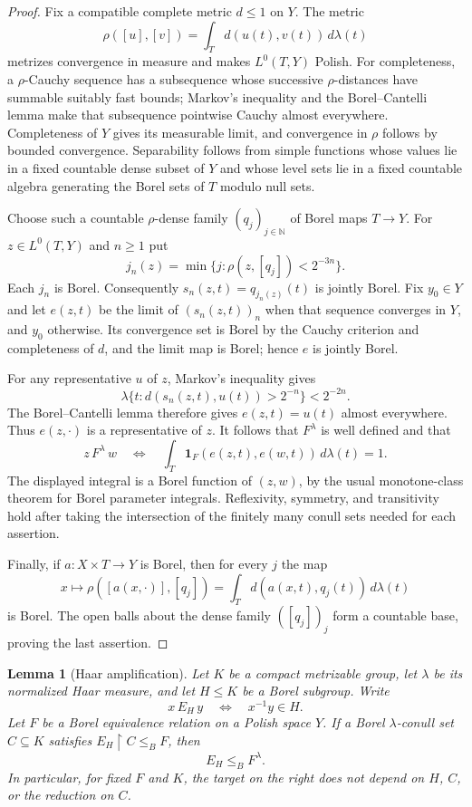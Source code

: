 \documentclass[11pt]{article}
\newtheorem{lemma}[theorem]{Lemma}
\theoremstyle{definition}
\theoremstyle{remark}
\newcommand{\Lzero}{L^0}
\begin{document}
\begin{proof}
Fix a compatible complete metric $d\leq 1$ on $Y$. The metric
\[
 \rho([u],[v])=\int_T d(u(t),v(t))\,d\lambda(t)
\]
metrizes convergence in measure and makes $\Lzero(T,Y)$ Polish. For
completeness, a $\rho$-Cauchy sequence has a subsequence whose successive
$\rho$-distances have summable suitably fast bounds; Markov's inequality
and the Borel--Cantelli lemma make that subsequence pointwise Cauchy
almost everywhere. Completeness of $Y$ gives its measurable limit,
and convergence in $\rho$ follows by bounded convergence. Separability
follows from simple functions whose values lie in a fixed countable
dense subset of $Y$ and whose level sets lie in a fixed countable
algebra generating the Borel sets of $T$ modulo null sets.

Choose such a countable $\rho$-dense family $(q_j)_{j\in\mathbb N}$
of Borel maps $T\to Y$. For $z\in\Lzero(T,Y)$ and $n\geq 1$ put
\[
 j_n(z)=\min\{j:\rho(z,[q_j])<2^{-3n}\}.
\]
Each $j_n$ is Borel. Consequently
$s_n(z,t)=q_{j_n(z)}(t)$ is jointly Borel. Fix $y_0\in Y$ and let
$e(z,t)$ be the limit of $(s_n(z,t))_n$ when that sequence converges
in $Y$, and $y_0$ otherwise. Its convergence set is Borel by the
Cauchy criterion and completeness of $d$, and the limit map is Borel;
hence $e$ is jointly Borel.

For any representative $u$ of $z$, Markov's inequality gives
\[
 \lambda\{t:d(s_n(z,t),u(t))>2^{-n}\}<2^{-2n}.
\]
The Borel--Cantelli lemma therefore gives $e(z,t)=u(t)$ almost
everywhere. Thus $e(z,\cdot)$ is a representative of $z$.
It follows that $F^\lambda$ is well defined and that
\[
 z\,F^\lambda\,w
 \quad\Longleftrightarrow\quad
 \int_T \mathbf 1_F(e(z,t),e(w,t))\,d\lambda(t)=1.
\]
The displayed integral is a Borel function of $(z,w)$, by the usual
monotone-class theorem for Borel parameter integrals. Reflexivity,
symmetry, and transitivity hold after taking the intersection of the
finitely many conull sets needed for each assertion.

Finally, if $a:X\times T\to Y$ is Borel, then for every $j$ the map
\[
 x\longmapsto\rho([a(x,\cdot)],[q_j])
 =\int_T d(a(x,t),q_j(t))\,d\lambda(t)
\]
is Borel. The open balls about the dense family $([q_j])_j$ form a
countable base, proving the last assertion.
\end{proof}

\begin{lemma}[Haar amplification]
Let $K$ be a compact metrizable group, let $\lambda$ be its normalized
Haar measure, and let $H\leq K$ be a Borel subgroup. Write
\[
 x\,E_H\,y\quad\Longleftrightarrow\quad x^{-1}y\in H.
\]
Let $F$ be a Borel equivalence relation on a Polish space $Y$.
If a Borel $\lambda$-conull set $C\subseteq K$ satisfies
$E_H\mathbin{\upharpoonright}C\leq_B F$, then
\[
 E_H\leq_B F^\lambda.
\]
In particular, for fixed $F$ and $K$, the target on the right does
not depend on $H$, $C$, or the reduction on $C$.
\end{lemma}
\end{document}
